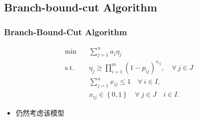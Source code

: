 \documentclass[10pt]{beamer}
\begin{document}
\subsection{Branch-bound-cut Algorithm}
\begin{frame}
    \frametitle{Branch-Bound-Cut Algorithm}
    {\scriptsize
    \begin{align}
        \min\quad & \sum_{j=1}^n a_j \eta_j \\ 
        \mathrm{s. t.}\quad & \eta_j \geq \prod_{i=1}^m (1 -  p_{ij})^{x_{ij}}, \quad \forall ~ j \in J \\ 
        &\sum_{j=1}^n x_{ij} \leq 1\quad \forall ~ i \in I,\\
        & x_{ij} \in \left\{ 0,1 \right\} \quad \forall ~ j\in J\quad i \in I.
    \end{align}
    }
    \begin{itemize}
        \item 仍然考虑该模型
    \end{itemize}
\end{frame}
\end{document}
